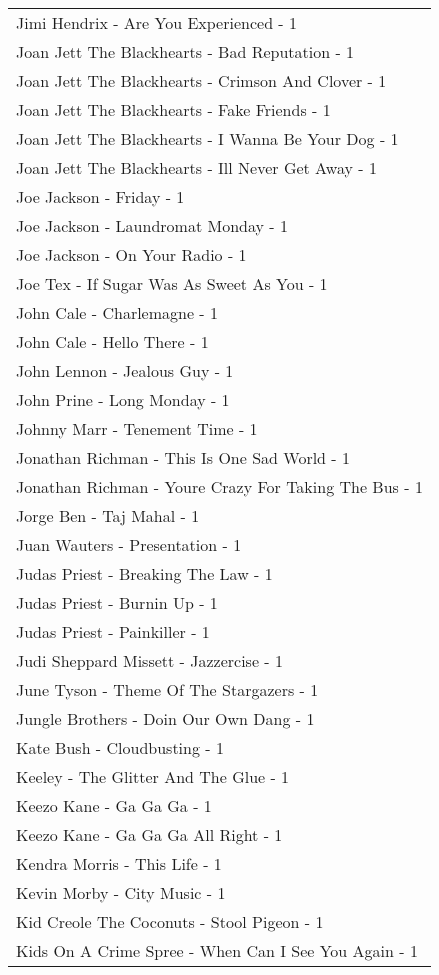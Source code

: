 \documentclass[
]{article}
\begin{document}
\begin{longtable}{l}
Jimi Hendrix - Are You Experienced - 1 \\ 
Joan Jett The Blackhearts - Bad Reputation - 1 \\ 
Joan Jett The Blackhearts - Crimson And Clover - 1 \\ 
Joan Jett The Blackhearts - Fake Friends - 1 \\ 
Joan Jett The Blackhearts - I Wanna Be Your Dog - 1 \\ 
Joan Jett The Blackhearts - Ill Never Get Away - 1 \\ 
Joe Jackson - Friday - 1 \\ 
Joe Jackson - Laundromat Monday - 1 \\ 
Joe Jackson - On Your Radio - 1 \\ 
Joe Tex - If Sugar Was As Sweet As You - 1 \\ 
John Cale - Charlemagne - 1 \\ 
John Cale - Hello There - 1 \\ 
John Lennon - Jealous Guy - 1 \\ 
John Prine - Long Monday - 1 \\ 
Johnny Marr - Tenement Time - 1 \\ 
Jonathan Richman - This Is One Sad World - 1 \\ 
Jonathan Richman - Youre Crazy For Taking The Bus - 1 \\ 
Jorge Ben - Taj Mahal - 1 \\ 
Juan Wauters - Presentation - 1 \\ 
Judas Priest - Breaking The Law - 1 \\ 
Judas Priest - Burnin Up - 1 \\ 
Judas Priest - Painkiller - 1 \\ 
Judi Sheppard Missett - Jazzercise - 1 \\ 
June Tyson - Theme Of The Stargazers - 1 \\ 
Jungle Brothers - Doin Our Own Dang - 1 \\ 
Kate Bush - Cloudbusting - 1 \\ 
Keeley - The Glitter And The Glue - 1 \\ 
Keezo Kane - Ga Ga Ga - 1 \\ 
Keezo Kane - Ga Ga Ga All Right - 1 \\ 
Kendra Morris - This Life - 1 \\ 
Kevin Morby - City Music - 1 \\ 
Kid Creole The Coconuts - Stool Pigeon - 1 \\ 
Kids On A Crime Spree - When Can I See You Again - 1 \\ 

\end{longtable}
\end{document}
